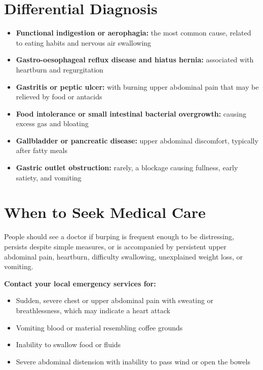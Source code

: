 \section*{Differential Diagnosis}
\begin{itemize}
    \item \textbf{Functional indigestion or aerophagia:} the most common cause, related to eating habits and nervous air swallowing
    \item \textbf{Gastro-oesophageal reflux disease and hiatus hernia:} associated with heartburn and regurgitation
    \item \textbf{Gastritis or peptic ulcer:} with burning upper abdominal pain that may be relieved by food or antacids
    \item \textbf{Food intolerance or small intestinal bacterial overgrowth:} causing excess gas and bloating
    \item \textbf{Gallbladder or pancreatic disease:} upper abdominal discomfort, typically after fatty meals
    \item \textbf{Gastric outlet obstruction:} rarely, a blockage causing fullness, early satiety, and vomiting
\end{itemize}

\section*{When to Seek Medical Care}
People should see a doctor if burping is frequent enough to be distressing, persists despite simple measures, or is accompanied by persistent upper abdominal pain, heartburn, difficulty swallowing, unexplained weight loss, or vomiting.

\textbf{Contact your local emergency services for:}
\begin{itemize}
    \item Sudden, severe chest or upper abdominal pain with sweating or breathlessness, which may indicate a heart attack
    \item Vomiting blood or material resembling coffee grounds
    \item Inability to swallow food or fluids
    \item Severe abdominal distension with inability to pass wind or open the bowels
\end{itemize}

